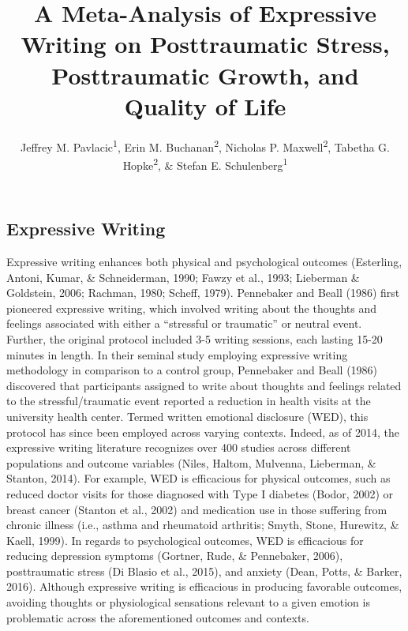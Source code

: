 \documentclass[,man]{apa6}
\title{A Meta-Analysis of Expressive Writing on Posttraumatic Stress, Posttraumatic Growth, and Quality of Life}
\author{Jeffrey M. Pavlacic\textsuperscript{1}, Erin M. Buchanan\textsuperscript{2}, Nicholas P. Maxwell\textsuperscript{2}, Tabetha G. Hopke\textsuperscript{2}, \& Stefan E. Schulenberg\textsuperscript{1}}
\date{}
\affiliation{
\vspace{0.5cm}
\textsuperscript{1} University of Mississippi\\\textsuperscript{2} Missouri State University}
\begin{document}
\maketitle

\hypertarget{expressive-writing}{%
\subsection{Expressive Writing}\label{expressive-writing}}

Expressive writing enhances both physical and psychological outcomes (Esterling, Antoni, Kumar, \& Schneiderman, 1990; Fawzy et al., 1993; Lieberman \& Goldstein, 2006; Rachman, 1980; Scheff, 1979). Pennebaker and Beall (1986) first pioneered expressive writing, which involved writing about the thoughts and feelings associated with either a \enquote{stressful or traumatic} or neutral event. Further, the original protocol included 3-5 writing sessions, each lasting 15-20 minutes in length. In their seminal study employing expressive writing methodology in comparison to a control group, Pennebaker and Beall (1986) discovered that participants assigned to write about thoughts and feelings related to the stressful/traumatic event reported a reduction in health visits at the university health center. Termed written emotional disclosure (WED), this protocol has since been employed across varying contexts. Indeed, as of 2014, the expressive writing literature recognizes over 400 studies across different populations and outcome variables (Niles, Haltom, Mulvenna, Lieberman, \& Stanton, 2014). For example, WED is efficacious for physical outcomes, such as reduced doctor visits for those diagnosed with Type I diabetes (Bodor, 2002) or breast cancer (Stanton et al., 2002) and medication use in those suffering from chronic illness (i.e., asthma and rheumatoid arthritis; Smyth, Stone, Hurewitz, \& Kaell, 1999). In regards to psychological outcomes, WED is efficacious for reducing depression symptoms (Gortner, Rude, \& Pennebaker, 2006), posttraumatic stress (Di Blasio et al., 2015), and anxiety (Dean, Potts, \& Barker, 2016). Although expressive writing is efficacious in producing favorable outcomes, avoiding thoughts or physiological sensations relevant to a given emotion is problematic across the aforementioned outcomes and contexts.
\end{document}
